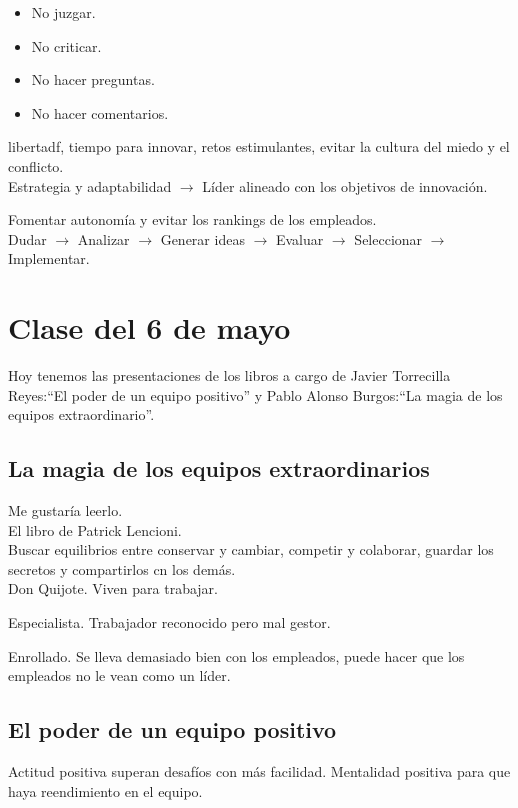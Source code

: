 \documentclass[12pt, a4paper, twoside]{article}
\begin{document}
\begin{itemize}
    \item No juzgar.
    \item No criticar.
    \item No hacer preguntas.
    \item No hacer comentarios.
\end{itemize}
libertadf, tiempo para innovar, retos estimulantes, evitar la cultura del miedo y 
el conflicto.\\

Estrategia y adaptabilidad $\rightarrow$ Líder alineado con los objetivos de innovación.

Fomentar autonomía y evitar los rankings de los empleados.\\

Dudar $\rightarrow$ Analizar $\rightarrow$ Generar ideas $\rightarrow$ Evaluar $\rightarrow$ Seleccionar $\rightarrow$ Implementar.\\

\section{Clase del 6 de mayo}

Hoy tenemos las presentaciones de los libros a cargo de Javier Torrecilla Reyes:``El poder de un equipo positivo''
y  Pablo Alonso Burgos:``La magia de los equipos extraordinario''.

\subsection{La magia de los equipos extraordinarios}
Me gustaría leerlo.\\
El libro de Patrick Lencioni.\\
Buscar equilibrios entre conservar y cambiar, competir y colaborar, guardar los secretos y compartirlos cn los demás.\\ 

Don Quijote. Viven para trabajar.

Especialista. Trabajador reconocido pero mal gestor.

Enrollado. Se lleva demasiado bien con los empleados, puede hacer que los empleados no le vean como un líder.

\subsection{El poder de un equipo positivo}
Actitud positiva superan desafíos con más facilidad. Mentalidad positiva para que haya reendimiento en el equipo.
\end{document}
